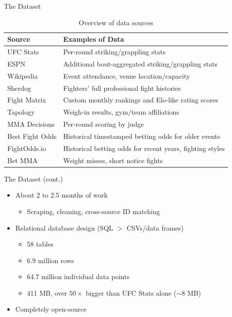 \documentclass[aspectratio=169,xcolor=dvipsnames]{beamer}
\begin{document}
\begin{frame}{The Dataset}
    \begin{table}[]
    \begin{tabular}{@{}ll@{}}
    \toprule
    Source          & Examples of Data                            \\ \midrule
    UFC Stats       & Per-round striking/grappling stats          \\
    ESPN            & Additional bout-aggregated striking/grappling stats         \\
    Wikipedia       & Event attendance, venue location/capacity   \\
    Sherdog         & Fighters' full professional fight histories \\
    Fight Matrix    & Custom monthly rankings and Elo-like rating scores           \\
    Tapology        & Weigh-in results, gym/team affiliations     \\
    MMA Decisions   & Per-round scoring by judge                  \\
    Best Fight Odds & Historical timestamped betting odds for older events        \\
    FightOdds.io    & Historical betting odds for recent years, fighting styles           \\
    Bet MMA         & Weight misses, short notice fights          \\ \bottomrule
    \end{tabular}
    \caption{Overview of data sources}
    \end{table}
\end{frame}


\begin{frame}{The Dataset (cont.)}
    \begin{itemize}
        \item About 2 to 2.5 months of work
        \begin{itemize}
            \item Scraping, cleaning, cross-source ID matching
        \end{itemize}

        \item Relational database design (SQL $>$ CSVs/data frames)
        \begin{itemize}
            \item 58 tables

            \item 6.9 million rows

            \item 64.7 million individual data points

            \item 411 MB, over $50 \times$ bigger than UFC Stats alone ($\sim 8$ MB)
        \end{itemize}

        \item Completely open-source
    \end{itemize}
\end{frame}
\end{document}
